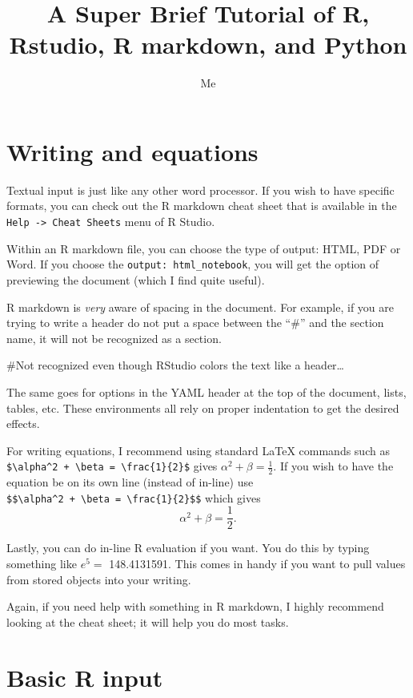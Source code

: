 \documentclass[
]{article}
\title{A Super Brief Tutorial of R, Rstudio, R markdown, and Python}
\author{Me}
\date{}
\begin{document}
\maketitle

{
\setcounter{tocdepth}{2}
\tableofcontents
}
\hypertarget{writing-and-equations}{%
\section{Writing and equations}\label{writing-and-equations}}

Textual input is just like any other word processor. If you wish to have
specific formats, you can check out the R markdown cheat sheet that is
available in the \texttt{Help\ -\textgreater{}\ Cheat\ Sheets} menu of R
Studio.

Within an R markdown file, you can choose the type of output: HTML, PDF
or Word. If you choose the \texttt{output:\ html\_notebook}, you will
get the option of previewing the document (which I find quite useful).

R markdown is \emph{very} aware of spacing in the document. For example,
if you are trying to write a header do not put a space between the
``\#'' and the section name, it will not be recognized as a section.

\#Not recognized even though RStudio colors the text like a
header\ldots{}

The same goes for options in the YAML header at the top of the document,
lists, tables, etc. These environments all rely on proper indentation to
get the desired effects.

For writing equations, I recommend using standard LaTeX commands such as
\texttt{\$\textbackslash{}alpha\^{}2\ +\ \textbackslash{}beta\ =\ \textbackslash{}frac\{1\}\{2\}\$}
gives \(\alpha^2 + \beta = \frac{1}{2}\). If you wish to have the
equation be on its own line (instead of in-line) use
\texttt{\$\$\textbackslash{}alpha\^{}2\ +\ \textbackslash{}beta\ =\ \textbackslash{}frac\{1\}\{2\}\$\$}
which gives \[\alpha^2 + \beta = \frac{1}{2}.\]

Lastly, you can do in-line R evaluation if you want. You do this by
typing something like \(e^5 =\) 148.4131591. This comes in handy if you
want to pull values from stored objects into your writing.

Again, if you need help with something in R markdown, I highly recommend
looking at the cheat sheet; it will help you do most tasks.

\hypertarget{basic-r-input}{%
\section{Basic R input}\label{basic-r-input}}
\end{document}
